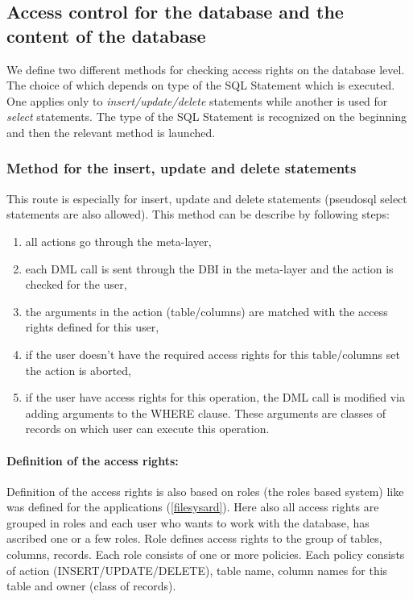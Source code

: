 \subsection{Access control for the database and the content of the database}
We define two different methods for checking access rights on the database level. The choice of which
depends on type of the SQL Statement which is executed.
One applies only to \emph{insert/update/delete}
statements while another is used for \emph{select} statements. The type of the SQL
Statement is recognized on the beginning and then the relevant method
is launched.


\subsubsection{Method for the insert, update and delete statements \label{pseudosql}}

This route is especially for insert, update and delete statements (pseudosql select statements are also allowed).
This method can be describe by following steps: 
\begin{enumerate}
\item all actions go through the meta-layer,
\item each DML call is sent through the DBI in the meta-layer and the action
is checked for the user,
\item the arguments in the action (table/columns) are matched with the access
rights defined for this user,
\item if the user doesn't have the required access rights for this table/columns
set the action is aborted, 
\item if the user have access rights for this operation, the DML call is
modified via adding arguments to the WHERE clause. These arguments
are classes of records on which user can execute this operation.
\end{enumerate}

\paragraph {Definition of the access rights:}
	
Definition of the access rights is also based on roles (the roles based system) like was defined for the applications (\ref{filesysard}). 
Here also all access rights are grouped in roles and each user who wants to work with the database,
has ascribed one or a few roles. Role defines access rights to the group of tables,
columns, records. Each role consists of one or more policies. Each
policy consists of action (INSERT/UPDATE/DELETE), table name, column
names for this table and owner (class of records).

